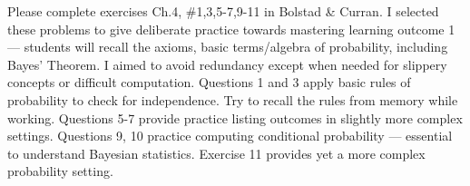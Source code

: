 \documentclass[11pt,article,landscape]{memoir}
\begin{document}
\maketitle

{\large Please complete exercises Ch.4, \#1,3,5-7,9-11 in Bolstad \& Curran. I selected these problems to give deliberate practice towards mastering learning outcome 1 --- students will recall the axioms, basic terms/algebra of probability, including Bayes' Theorem. I aimed to avoid redundancy except when needed for slippery concepts or difficult computation. Questions 1 and 3 apply basic rules of probability to check for independence. Try to recall the rules from memory while working. Questions 5-7 provide practice listing outcomes in slightly more complex settings. Questions 9, 10 practice computing conditional probability --- essential to understand Bayesian statistics. Exercise 11 provides yet a more complex probability setting.}
\end{document}
